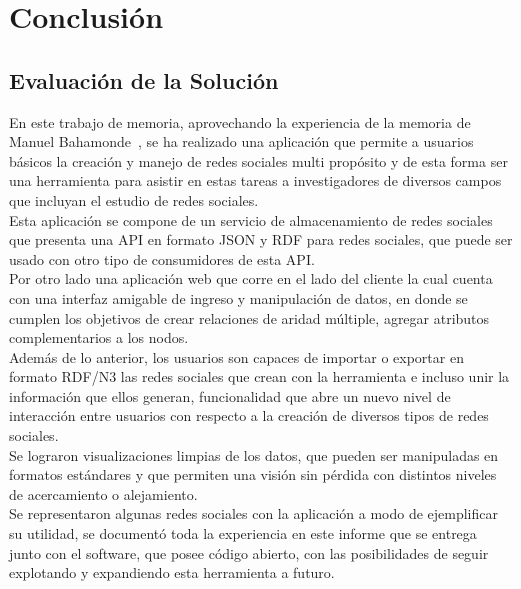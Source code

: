 
\chapter{Conclusión}

\section{Evaluación de la Solución} %
\label{sec:evaluacion_de_la_solucion}

En este trabajo de memoria, aprovechando la experiencia de la memoria de Manuel Bahamonde~\cite{memoriamanuel}, se ha realizado una aplicación que permite a usuarios básicos la creación y manejo de redes sociales multi propósito y de esta forma ser una herramienta para asistir en estas tareas a investigadores de diversos campos que incluyan el estudio de redes sociales.\\

Esta aplicación se compone de un servicio de almacenamiento de redes sociales que presenta una API en formato JSON y RDF para redes sociales, que puede ser usado con otro tipo de consumidores de esta API.\\

Por otro lado una aplicación web que corre en el lado del cliente la cual cuenta con una interfaz amigable de ingreso y manipulación de datos, en donde se cumplen los objetivos de crear relaciones de aridad múltiple, agregar atributos complementarios a los nodos.\\

Además de lo anterior, los usuarios son capaces de importar o exportar en formato RDF/N3 las redes sociales que crean con la herramienta e incluso unir la información que ellos generan, funcionalidad que abre un nuevo nivel de interacción entre usuarios con respecto a la creación de diversos tipos de redes sociales.\\

Se lograron visualizaciones limpias de los datos, que pueden ser manipuladas en formatos estándares y que permiten una visión sin pérdida con distintos niveles de acercamiento o alejamiento.\\

Se representaron algunas redes sociales con la aplicación a modo de ejemplificar su utilidad, se documentó toda la experiencia en este informe que se entrega junto con el software, que posee código abierto, con las posibilidades de seguir explotando y expandiendo esta herramienta a futuro.

